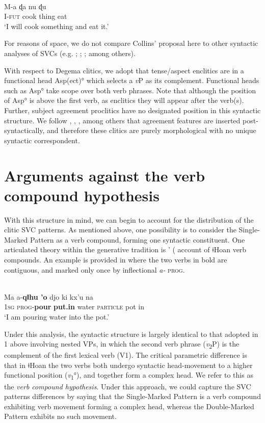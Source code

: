 \documentclass[output=paper]{langsci/langscibook}
\begin{document}
\ea
{}\\
\gll  M-a  ɖa    nu    ɖu\\
     I-\textsc{fut}  cook  thing  eat\\
\glt ‘I will cook something and eat it.’ \citep[490-491]{Collins1997}
\z

For reasons of space, we do not compare Collins’ proposal here to other syntactic analyses of SVCs (e.g. \citealt{Baker1989};  \citealt{HiraiwaBodomo2008}; \citealt{Aboh2009}; among others). 

With respect to Degema clitics, we adopt that tense/aspect enclitics are in a functional head Asp(ect)° which selects a \textit{v}P as its complement. Functional heads such as Asp° take scope over both verb phrases. Note that although the position of Asp° is above the first verb, as enclitics they will appear after the verb(s). Further, subject agreement proclitics have no designated position in this syntactic structure. We follow \citet{EmbickNoyer2007}, \citet{Kramer2010}, \citet{Norris2014}, among others that agreement features are inserted post-syntactically, and therefore these clitics are purely morphological with no unique syntactic correspondent. 

\section{Arguments against the verb compound hypothesis}
\label{bkm:Ref449523633}
With this structure in mind, we can begin to account for the distribution of the clitic SVC patterns. As mentioned above, one possibility is to consider the Single-Marked Pattern as a verb compound, forming one syntactic constituent. One articulated theory within the generative tradition is \citeauthor{Collins2002}’ (\citeyear*{collins2002} account of ǂHoan verb compounds. An example is provided in  where the two verbs in bold are contiguous, and marked only once by inflectional \textit{a-} \textsc{prog}.

\ea
{}\\
\gll  Ma  a-\textbf{qǁhu    {\textbar}’o}    djo    ki      kx’u    na\\
     \textsc{1sg}   \textsc{prog}{}-\textbf{pour}  \textbf{put.in}  water  \textsc{particle}  pot    in\\
\glt ‘I am pouring water into the pot.’ \citep[1]{Collins2002}
\z

Under this analysis, the syntactic structure is largely identical to that adopted in 1 above involving nested VPs, in which the second verb phrase (\textit{v}\textsubscript{2}P) is the complement of the first lexical verb (V1). The critical parametric difference is that in ǂHoan the two verbs both undergo syntactic head-movement to a higher functional position (\textit{v}\textsubscript{1}°), and together form a complex head. We refer to this as the \textit{verb compound hypothesis}. Under this approach, we could capture the SVC patterns differences by saying that the Single-Marked Pattern is a verb compound exhibiting verb movement forming a complex head, whereas the Double-Marked Pattern exhibits no such movement. 
\end{document}
